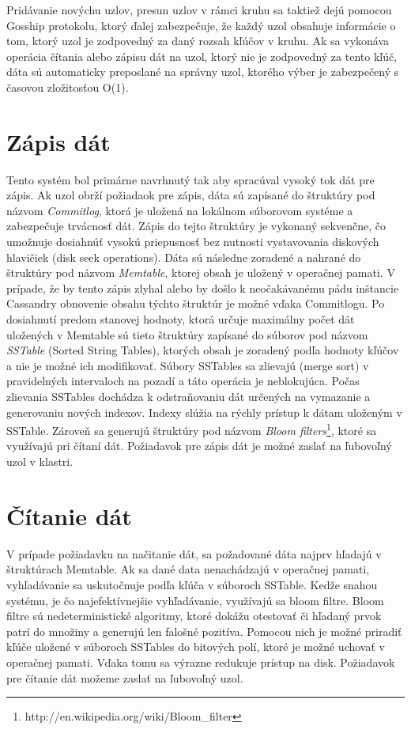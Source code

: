 \documentclass[11pt,twoside,a4paper]{book}
\begin{document}
Pridávanie novýchu uzlov, presun uzlov v rámci kruhu sa taktiež dejú pomocou Gosship protokolu, ktorý ďalej zabezpečuje, že každý uzol obsahuje informácie o tom, ktorý uzol je zodpovedný za daný rozsah kľúčov v kruhu. Ak sa vykonáva operácia čítania alebo zápisu dát na uzol, ktorý nie je zodpovedný za tento kľúč, dáta sú automaticky preposlané na správny uzol, ktorého výber je zabezpečený s časovou zložitosťou O(1).


\section{Zápis dát}
Tento systém bol primárne navrhnutý tak aby spracúval vysoký tok dát pre zápis. Ak uzol obrží požiadaok pre zápis, dáta sú zapísané do štruktúry pod názvom \emph{Commitlog}, ktorá je uložená na lokálnom súborovom systéme a zabezpečuje trvácnosť dát. Zápis do tejto štruktúry je vykonaný sekvenčne, čo umožnuje dosiahnúť vysokú priepusnosť bez nutnosti vystavovania diskových hlavičiek (disk seek operations). Dáta sú následne zoradené a nahrané do štruktúry pod názvom \emph{Memtable}, ktorej obsah je uložený v operačnej pamati. V prípade, že by tento zápis zlyhal alebo by došlo k neočakávanému pádu inštancie Cassandry obnovenie obsahu týchto štruktúr je možné vďaka Commitlogu. Po dosiahnutí predom stanovej hodnoty, ktorá určuje maximálny počet dát uložených v Memtable sú tieto štruktúry zapísané do súborov pod názvom \emph{SSTable} (Sorted String Tables), ktorých obsah je zoradený podľa hodnoty kľúčov a nie je možné ich modifikovať. Súbory SSTables sa zlievajú (merge sort) v pravidelných intervaloch na pozadí a táto operácia je neblokujúca. Počas zlievania SSTables dochádza k odstraňovaniu dát určených na vymazanie a generovaniu nových indexov. Indexy slúžia na rýchly prístup k dátam uloženým v SSTable. Zároveň sa generujú štruktúry pod názvom \emph{Bloom filters}\footnote{http://en.wikipedia.org/wiki/Bloom\_filter}, ktoré sa využívajú pri čítaní dát. Požiadavok pre zápis dát je možné zaslať na ľubovoľný uzol v klastri.


\section{Čítanie dát}
V prípade požiadavku na načitanie dát, sa požadované dáta najprv hľadajú v štruktúrach Memtable. Ak sa dané data nenachádzajú v operačnej pamati, vyhľadávanie sa uskutočnuje podľa kľúča v súboroch SSTable. Kedže snahou systému, je čo najefektívnejšie vyhľadávanie, využívajú sa bloom filtre. Bloom filtre sú nedeterministické algoritmy, ktoré dokážu otestovať či hľadaný prvok patrí do množiny a generujú len falošné pozitíva. Pomocou nich je možné priradiť kľúče uložené v súboroch SSTables do bitových polí, ktoré je možné uchovať v operačnej pamati. Vďaka tomu sa výrazne redukuje prístup na disk. Požiadavok pre čítanie dát možeme zaslať na ľubovoľný uzol.
\end{document}
